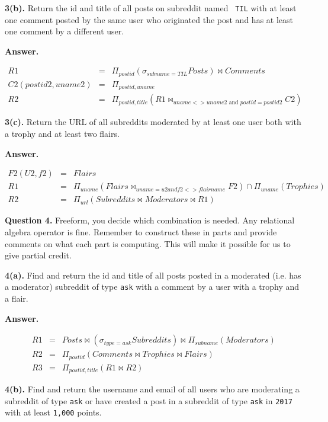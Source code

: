 \documentclass[11pt]{article}
\begin{document}
{\bf 3(b).} Return the id and title of all posts on subreddit named {\tt
  TIL} with at least one comment posted by the same user who
  originated the post and has at least one comment by a different
  user.

{\bf Answer.} 

\begin{eqnarray*}
  R1 & = & \Pi_{postid} (\sigma_{subname=TIL} Posts) \bowtie Comments \\
  C2(postid2, uname2)  & = & \Pi_{postid,uname} \\
  R2 & = & \Pi_{postid,title} (R1 \bowtie_{uname<>uname2 \mbox{ and } postid=postid2} C2)
\end{eqnarray*}


{\bf 3(c).} Return the URL of all subreddits moderated by at least one
user both with a trophy and at least two flairs.

{\bf Answer.} 

\begin{eqnarray*}
  F2(U2,f2) & = & Flairs \\
  R1 & = & \Pi_{uname} (Flairs \bowtie_{uname=u2 and f2<>flairname} F2) \cap \Pi_{uname} (Trophies) \\
  R2 & = & \Pi_{url} (Subreddits \bowtie Moderators \bowtie R1)
\end{eqnarray*}


\newpage 

{\bf Question 4.} Freeform, you decide which combination is
needed. Any relational algebra operator is fine. Remember to construct
these in parts and provide comments on what each part is computing. This will make
it possible for us to give partial credit.

{\bf 4(a).} Find and return the id and title of all posts posted in a
  moderated (i.e. has a moderator) subreddit of type {\tt ask} with a
  comment by a user with a trophy and a flair.

{\bf Answer.} 

\begin{eqnarray*}
  R1 & = & Posts \bowtie (\sigma_{type=ask} Subreddits) \bowtie \Pi_{subname} (Moderators) \\
  R2 & = & \Pi_{postid}(Comments \bowtie Trophies \bowtie Flairs) \\
  R3 & = & \Pi_{postid,title} (R1 \bowtie R2)
\end{eqnarray*}


{\bf 4(b).} Find and return the username and email of all users who are
moderating a subreddit of type {\tt ask} or have created a post in a
subreddit of type {\tt ask} in {\tt 2017} with at least {\tt 1,000}
points.
\end{document}
